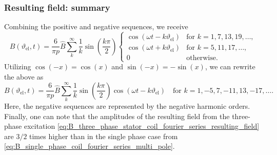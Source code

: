 \begin{frame}
	\frametitle{Resulting field: summary}
    Combining the positive and negative sequences, we receive
    \begin{equation}
        B(\vartheta_\mathrm{el}, t) = \frac{6}{\pi p} \hat{B} \sum_{k}^{\infty} \frac{1}{k} \sin\left(\frac{k \pi}{2}\right) \begin{cases}
            \cos(\omega t - k \vartheta_\mathrm{el}) & \text{for } k=1,7,13,19,\ldots, \\
            \cos(\omega t + k \vartheta_\mathrm{el}) & \text{for } k=5,11,17,\ldots, \\
            0 & \text{otherwise}.
        \end{cases}
    \end{equation}
    Utilizing $\cos(-x)=\cos(x)$ and $\sin(-x)=-\sin(x)$, we can rewrite the above as
    \begin{equation}
        B(\vartheta_\mathrm{el}, t) = \frac{6}{\pi p} \hat{B} \sum_{k}^{\infty} \frac{1}{k} \sin\left(\frac{k \pi}{2}\right) \cos(\omega t - k \vartheta_\mathrm{el}) \quad \mbox{for } k=1,-5,7,-11,13,-17,\ldots.
        \label{eq:B_three_phase_stator_coil_fourier_series_resulting_field}
    \end{equation}
    Here, the negative sequences are represented by the negative harmonic orders. Finally, one can note that the amplitudes of the resulting field from the three-phase excitation \eqref{eq:B_three_phase_stator_coil_fourier_series_resulting_field} are $3/2$ times higher than in the single phase case from \eqref{eq:B_single_phase_coil_fourier_series_multi_pole}.
\end{frame}


